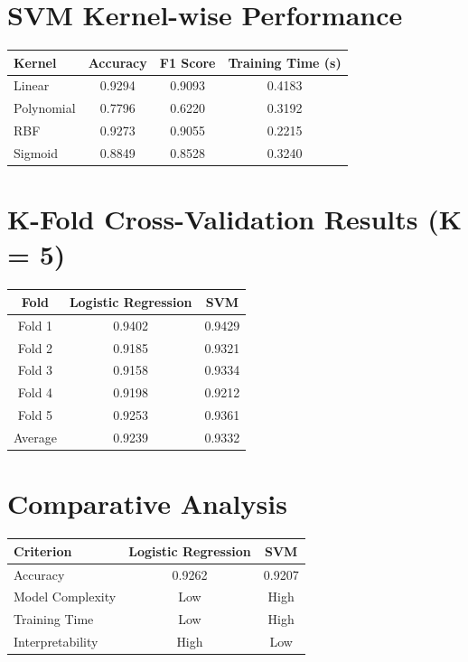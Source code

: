 \documentclass[11pt]{article}
\begin{document}
\section*{SVM Kernel-wise Performance}
\begin{table}[h!]
\centering
\renewcommand{\arraystretch}{1.3}
\begin{tabular}{|l|c|c|c|}
\hline
Kernel & Accuracy & F1 Score & Training Time (s) \\ \hline
Linear & 0.9294 & 0.9093 & 0.4183 \\
Polynomial & 0.7796 & 0.6220 & 0.3192 \\
RBF & 0.9273 & 0.9055 & 0.2215 \\
Sigmoid & 0.8849 & 0.8528 & 0.3240 \\ \hline
\end{tabular}
\end{table}

\section*{K-Fold Cross-Validation Results (K = 5)}
\begin{table}[h!]
\centering
\renewcommand{\arraystretch}{1.3}
\begin{tabular}{|c|c|c|}
\hline
Fold & Logistic Regression & SVM \\ \hline
Fold 1 & 0.9402 & 0.9429 \\
Fold 2 & 0.9185 & 0.9321 \\
Fold 3 & 0.9158 & 0.9334 \\
Fold 4 & 0.9198 & 0.9212 \\
Fold 5 & 0.9253 & 0.9361 \\ \hline
Average & 0.9239 & 0.9332 \\ \hline
\end{tabular}
\end{table}

\section*{Comparative Analysis}
\begin{table}[h!]
\centering
\renewcommand{\arraystretch}{1.3}
\begin{tabular}{|l|c|c|}
\hline
Criterion & Logistic Regression & SVM \\ \hline
Accuracy & 0.9262 & 0.9207 \\
Model Complexity & Low & High \\
Training Time & Low & High \\
Interpretability & High & Low \\ \hline
\end{tabular}
\end{table}
\end{document}
